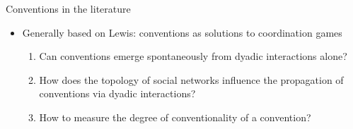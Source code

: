 \documentclass[10pt]{beamer}
\begin{document}
\begin{frame}{Conventions in the literature}
\begin{itemize}
    \item<1-> Generally based on Lewis: conventions as solutions to coordination games \citep{Lewis2002}
    \begin{enumerate}
        \item<2-> Can conventions emerge spontaneously from dyadic interactions alone? \citep{Centola2015,hawkins2019emergence}
        \item<3-> How does the topology of social networks influence the propagation of conventions via dyadic interactions? \citep{pujol2005role,delgado2002emergence}
        \item<4-> How to measure the degree of conventionality of a convention? \citep{OConnor2020}
    \end{enumerate}

\end{itemize}
\end{frame}
\end{document}
